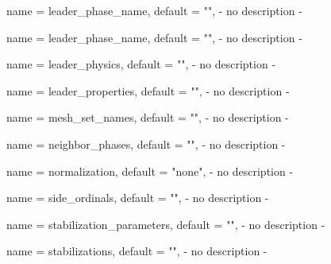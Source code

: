 \begin{parameter}{
    name    = {leader_phase_name},
    default = {""},
}
- no description -
\end{parameter}

\begin{parameter}{
    name    = {leader_phase_name},
    default = {""},
}
- no description -
\end{parameter}

\begin{parameter}{
    name    = {leader_physics},
    default = {""},
}
- no description -
\end{parameter}

\begin{parameter}{
    name    = {leader_properties},
    default = {""},
}
- no description -
\end{parameter}

\begin{parameter}{
    name    = {mesh_set_names},
    default = {""},
}
- no description -
\end{parameter}

\begin{parameter}{
    name    = {neighbor_phases},
    default = {""},
}
- no description -
\end{parameter}

\begin{parameter}{
    name    = {normalization},
    default = {"none"},
}
- no description -
\end{parameter}

\begin{parameter}{
    name    = {side_ordinals},
    default = {""},
}
- no description -
\end{parameter}

\begin{parameter}{
    name    = {stabilization_parameters},
    default = {""},
}
- no description -
\end{parameter}

\begin{parameter}{
    name    = {stabilizations},
    default = {""},
}
- no description -
\end{parameter}

